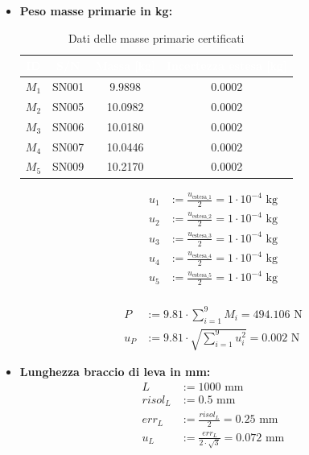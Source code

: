 \documentclass[a4paper, twoside]{article}
\begin{document}
\begin{itemize}

\item{
\noindent
\textbf{Peso masse primarie in kg:}

\begin{table}[H]
    \centering
    \renewcommand{\arraystretch}{1.3}
    \begin{tabular}{|c|c|c|c|}
        \hline
        \rowcolor{headerblue}
        \textcolor{white}{\textbf{ID}} & \textcolor{white}{\textbf{S/N}} & \textcolor{white}{\textbf{Massa [kg]}} & \textcolor{white}{\textbf{Incertezza estesa [kg]}} \\
        \hline
        \rowcolor{rowlight}
        $M_{1}$ & SN001 & 9.9898  & 0.0002 \\
        \hline
        $M_{2}$ & SN005 & 10.0982 & 0.0002 \\
        \hline
        \rowcolor{rowlight}
        $M_{3}$ & SN006 & 10.0180 & 0.0002 \\
        \hline
        $M_{4}$ & SN007 & 10.0446 & 0.0002 \\
        \hline
        \rowcolor{rowlight}
        $M_{5}$ & SN009 & 10.2170 & 0.0002 \\
        \hline
    \end{tabular}
    \caption{Dati delle masse primarie certificati}
    \label{tab:dati_masse}
\end{table}

\begin{align}
u_{1} &:= \frac{u_{\text{estesa}\_1}}{2} = 1 \cdot 10^{-4} \text{ kg} \\
u_{2} &:= \frac{u_{\text{estesa}\_2}}{2} = 1 \cdot 10^{-4} \text{ kg} \\
u_{3} &:= \frac{u_{\text{estesa}\_3}}{2} = 1 \cdot 10^{-4} \text{ kg} \\
u_{4} &:= \frac{u_{\text{estesa}\_4}}{2} = 1 \cdot 10^{-4} \text{ kg} \\
u_{5} &:= \frac{u_{\text{estesa}\_5}}{2} = 1 \cdot 10^{-4} \text{ kg} \\
\end{align}

\begin{align}
P &:= 9.81 \cdot \sum_{i=1}^{9} M_{i} = 494.106 \text{ N} \\
u_{P} &:= 9.81 \cdot \sqrt{\sum_{i=1}^{9} u_{i}^{2}} = 0.002 \text{ N}
\end{align}
}

\item{
\noindent
\textbf{Lunghezza braccio di leva in mm:}
\begin{align}
L &:= 1000 \text{ mm} \\
risol_{L} &:= 0.5 \text{ mm} \\
err_{L} &:= \frac{risol_{L}}{2} = 0.25 \text{ mm} \\
u_{L} &:= \frac{err_{L}}{2 \cdot \sqrt{3}} = 0.072 \text{ mm}
\end{align}
}


\end{itemize}
\end{document}
